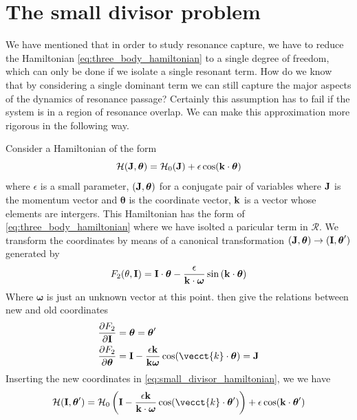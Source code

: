 \section{The small divisor problem}
\label{sec:The_small_divisor_problem}
We have mentioned that in order to study resonance capture, we have
to reduce the Hamiltonian \ref{eq:three_body_hamiltonian} to a 
single degree of freedom, which can only be done if we isolate 
a single resonant term. How do we know that by considering a single
dominant term we can still capture the major aspects of the dynamics
of resonance passage? Certainly this assumption has to fail if
the system is in a region of resonance overlap. We can make this 
approximation more rigorous in the following way.

Consider a Hamiltonian of the form
\begin{equation}
    \mathcal{H}(\boldsymbol{\mathbf{J}},\boldsymbol{\theta})=\mathcal{H}_0(\boldsymbol{\mathbf{J}})+
    \epsilon\cos(\boldsymbol{\mathbf{k}}\cdot\boldsymbol{\theta})
    \label{eq:small_divisor_hamiltonian}
\end{equation}
where $\epsilon$ is a small parameter, $(\boldsymbol{\mathbf{J}},\boldsymbol{\theta})$
for a conjugate pair of variables where $\boldsymbol{\mathbf{J}}$ is the momentum
vector and $\boldsymbol{\theta}$ is the coordinate vector, $\boldsymbol{\mathbf{k}}$ is
a vector whose elements are intergers. This Hamiltonian has the form of
\cref{eq:three_body_hamiltonian} where we have isolted a paricular term
in $\mathcal{R}$. We transform the coordinates
by means of a canonical transformation $(\boldsymbol{\mathbf{J}},\boldsymbol{\theta})
\rightarrow (\boldsymbol{\mathbf{I}},\boldsymbol{\theta}')$ generated by
\begin{equation}
    F_2(\theta, \boldsymbol{\mathbf{I}})=\boldsymbol{\mathbf{I}}\cdot\boldsymbol{\theta}
    - \frac{\epsilon}{\boldsymbol{\mathbf{k}}\cdot\boldsymbol{\omega}} \sin{(\boldsymbol{\mathbf{k}}\cdot
    \boldsymbol{\theta})}
\end{equation}
Where $\boldsymbol{\omega}$ is just an unknown vector at this point.
 then give the relations between new and old
coordinates
\begin{align}
    \frac{\partial F_2}{\partial \vect{I}} &=\boldsymbol{\theta}
    =\boldsymbol{\theta}'\\
    \frac{\partial F_2}{\partial \boldsymbol{\theta}}&=\vect{I}
    - \frac{\epsilon\vect{k}}{\vect{k}\boldsymbol{\omega}}\cos
    (\vecct{k}\cdot\boldsymbol{\theta})=\vect{J}\label{
        eq:small_divisor}
\end{align}
Inserting the new coordinates in \cref{eq:small_divisor_hamiltonian}, we
we have
\begin{equation}
    \mathcal{H}(\vect{I},\boldsymbol{\theta}')=\mathcal{H}_0\left(
\vect{I} - \frac{\epsilon\vect{k}}{\vect{k}\cdot\boldsymbol{\omega}}\cos
    (\vecct{k}\cdot\boldsymbol{\theta}')\right) +\epsilon\cos
    (\vect{k}\cdot\boldsymbol{\theta}')
\end{equation}
